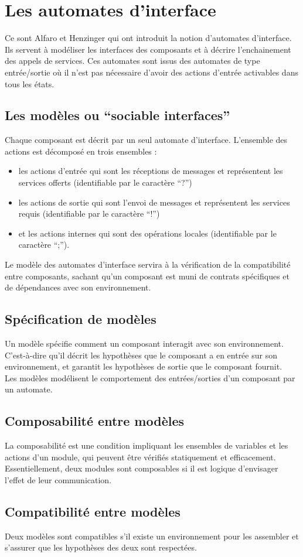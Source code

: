 \chapter{Les automates d'interface}

Ce sont Alfaro et Henzinger qui ont introduit la notion d'automates d'interface. Ils servent à modéliser les interfaces des composants et à décrire l'enchainement des appels de services. Ces automates sont issus des automates de type entrée/sortie où il n'est pas nécessaire d'avoir des actions d'entrée activables dans tous les états.\\

\section{Les modèles ou \enquote{sociable interfaces}}
Chaque composant est décrit par un seul automate d'interface. 
L'ensemble des actions est décomposé en trois ensembles : 
\begin{itemize}
\item les actions d'entrée qui sont les réceptions de messages et représentent les services offerts (identifiable par le caractère \enquote{?})
\item les actions de sortie qui sont l'envoi de messages et représentent les services requis (identifiable par le caractère \enquote{!})
\item et les actions internes qui sont des opérations locales (identifiable par le caractère \enquote{;}).\\

\end{itemize}

Le modèle des automates d'interface servira à la vérification de la compatibilité entre composants, sachant qu'un composant est muni de contrats spécifiques et de dépendances avec son environnement.

\section{Spécification de modèles}
Un modèle spécifie comment un composant interagit avec son environnement. C'est-à-dire qu'il décrit les hypothèses que le composant a en entrée sur son environnement, et garantit les hypothèses de sortie que le composant fournit.\\
Les modèles modélisent le comportement des entrées/sorties d'un composant par un automate.

\section{Composabilité entre modèles}
La composabilité est une condition impliquant les ensembles de variables et les actions d'un module, qui peuvent être vérifiés statiquement et efficacement. Essentiellement, deux
modules sont composables si il est logique d'envisager l'effet de leur communication.

\section{Compatibilité entre modèles}
Deux modèles sont compatibles s'il existe un environnement pour les assembler et s'assurer que les hypothèses des deux sont respectées.

